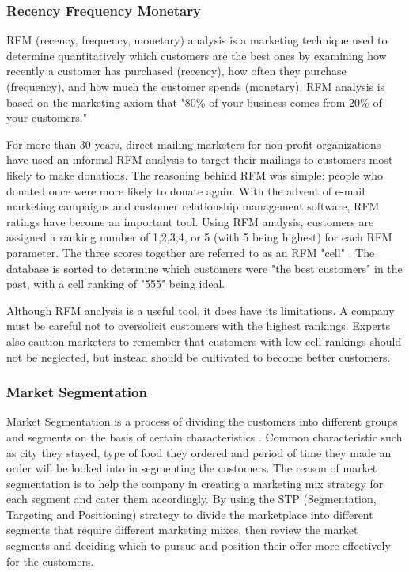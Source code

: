 \documentclass[journal]{IEEEtran}
\begin{document}
\subsubsection{Recency Frequency Monetary}
RFM (recency, frequency, monetary) analysis is a marketing technique used to determine quantitatively which customers are the best ones by examining how recently a customer has purchased (recency), how often they purchase (frequency), and how much the customer spends (monetary). RFM analysis is based on the marketing axiom that "80\% of your business comes from 20\% of your customers."

For more than 30 years, direct mailing marketers for non-profit organizations have used an informal RFM analysis to target their mailings to customers most likely to make donations. The reasoning behind RFM was simple: people who donated once were more likely to donate again. With the advent of e-mail marketing campaigns and customer relationship management software, RFM ratings have become an important tool. Using RFM analysis, customers are assigned a ranking number of 1,2,3,4, or 5 (with 5 being highest) for each RFM parameter. The three scores together are referred to as an RFM "cell" . The database is sorted to determine which customers were "the best customers" in the past, with a cell ranking of "555" being ideal.

Although RFM analysis is a useful tool, it does have its limitations. A company must be careful not to oversolicit customers with the highest rankings. Experts also caution marketers to remember that customers with low cell rankings should not be neglected, but instead should be cultivated to become better customers.
\subsubsection{Market Segmentation}
Market Segmentation is a process of dividing the customers into different groups and segments on the basis of certain characteristics \cite{Dutta2018-db}. Common characteristic such as city they stayed, type of food they ordered and period of time they made an order will be looked into in segmenting the customers. The reason of market segmentation is to help the company in creating a marketing mix strategy for each segment and cater them accordingly. By using the STP (Segmentation, Targeting and Positioning) strategy to divide the marketplace into different segments that require different marketing mixes, then review the market segments and deciding which to pursue and position their offer more effectively for the customers.
\end{document}
